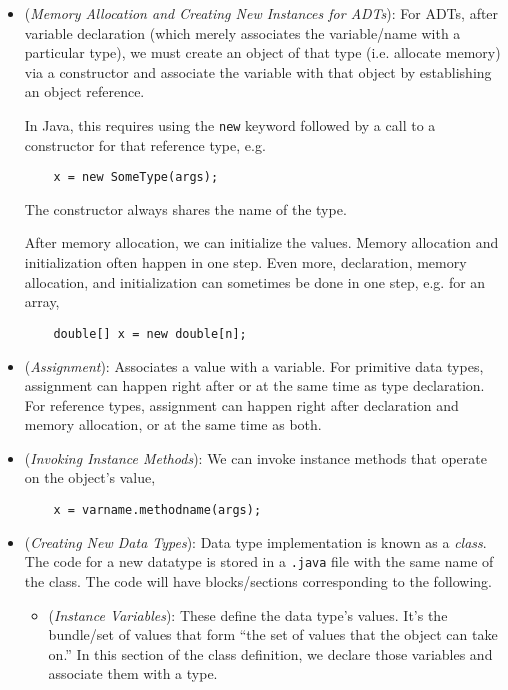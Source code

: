 \documentclass[12pt]{article}
\theoremstyle{plain}
\theoremstyle{definition}
\theoremstyle{remark}
\begin{document}
\begin{itemize}
  \item
    (\emph{Memory Allocation and Creating New Instances for ADTs}):
    For ADTs, after variable declaration (which merely associates the
    variable/name with a particular type), we must create an
    object of that type (i.e. allocate memory) via a constructor and
    associate the variable with that object by establishing an object
    reference.

    In Java, this requires using the \texttt{new} keyword followed by a
    call to a constructor for that reference type, e.g.
    \begin{lstlisting}
    x = new SomeType(args);
    \end{lstlisting}
    The constructor always shares the name of the type.

    After memory allocation, we can initialize the values.
    Memory allocation and initialization often happen in one step.
    Even more, declaration, memory allocation, and initialization can
    sometimes be done in one step, e.g. for an array,
    \begin{lstlisting}
    double[] x = new double[n];
    \end{lstlisting}

  \item (\emph{Assignment}):
    Associates a value with a variable.
    For primitive data types, assignment can happen right after or at
    the same time as type declaration.
    For reference types, assignment can happen right after declaration
    and memory allocation, or at the same time as both.

  \item
    (\emph{Invoking Instance Methods}):
    We can invoke instance methods that operate on the object's value,
    \begin{lstlisting}
    x = varname.methodname(args);
    \end{lstlisting}


  \item (\emph{Creating New Data Types}):
    Data type implementation is known as a \emph{class}.
    The code for a new datatype is stored in a \texttt{.java} file with
    the same name of the class.
    The code will have blocks/sections corresponding to the following.
    \begin{itemize}
      \item (\emph{Instance Variables}):
        These define the data type's values.
        It's the bundle/set of values that form ``the set of values that
        the object can take on.''
        In this section of the class definition, we declare those
        variables and associate them with a type.


\end{itemize}
\end{itemize}
\end{document}
